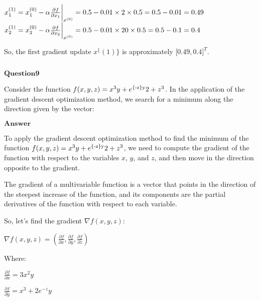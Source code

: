 \documentclass[11pt]{article}
\makeatletter
\newcommand{\boxspacing}{\kern\kvtcb@left@rule\kern\kvtcb@boxsep}
\newcommand{\prompt}[4]{
        {\ttfamily\llap{{\color{#2}[#3]:\hspace{3pt}#4}}\vspace{-\baselineskip}}
    }
\makeatother
\begin{document}
$ x_1^{(1)}  = x_1^{(0)} - \alpha \frac{\partial f}{\partial x_1} \bigg|_{x^{(0)}} \\
 = 0.5 - 0.01 \times 2 \times 0.5 \\
 = 0.5 - 0.01 \\
 = 0.49 $ 
$ x_2^{(1)}  = x_2^{(0)} - \alpha \frac{\partial f}{\partial x_2} \bigg|_{x^{(0)}} \\
 = 0.5 - 0.01 \times 20 \times 0.5 \\
 = 0.5 - 0.1 \\
 = 0.4  $

So, the first gradient update $ x^\{(1)\} $ is approximately $
{[}0.49, 0.4{]}^T $.

    \begin{tcolorbox}[breakable, size=fbox, boxrule=1pt, pad at break*=1mm,colback=cellbackground, colframe=cellborder]
\prompt{In}{incolor}{ }{\boxspacing}
\begin{Verbatim}[commandchars=\\\{\}]

\end{Verbatim}
\end{tcolorbox}

    $\textbf{Question9}$

Consider the function $f(x,y,z)=x^3y + e\textsuperscript{\{-z\}y}2 +z^3$. 
In the application of the gradient descent optimization method, we search for a minimum along the direction given by the vector:

$\textbf{Answer}$

    To apply the gradient descent optimization method to find the minimum of
the function $ f(x, y, z) = x^3y + e\textsuperscript{\{-z\}y}2 +
z^3 $, we need to compute the gradient of the function with respect
to the variables $ x $, $ y $, and $ z $, and then move in the
direction opposite to the gradient.

The gradient of a multivariable function is a vector that points in the
direction of the steepest increase of the function, and its components
are the partial derivatives of the function with respect to each
variable.

So, let's find the gradient $ \nabla f(x, y, z) $:

$\nabla f(x, y, z) = \left( \frac{\partial f}{\partial x}, \frac{\partial f}{\partial y}, \frac{\partial f}{\partial z} \right)$

Where:

$\frac{\partial f}{\partial x} = 3x^2 y$

$\frac{\partial f}{\partial y} = x^3 + 2e^{-z}y$
\end{document}
